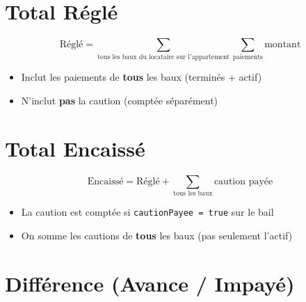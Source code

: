\documentclass[a4paper,12pt]{article}
\begin{document}
\section{Total Réglé}

\begin{formulebox}
\begin{equation}
\text{Réglé} = \sum_{\text{tous les baux du locataire sur l'appartement}} \sum_{\text{paiements}} \text{montant}
\end{equation}
\vspace{-0.3cm}
\begin{itemize}[noitemsep]
  \item Inclut les paiements de \textbf{tous} les baux (terminés + actif)
  \item N'inclut \textbf{pas} la caution (comptée séparément)
\end{itemize}
\end{formulebox}

\section{Total Encaissé}

\begin{formulebox}
\begin{equation}
\text{Encaissé} = \text{Réglé} + \sum_{\text{tous les baux}} \text{caution payée}
\end{equation}
\vspace{-0.3cm}
\begin{itemize}[noitemsep]
  \item La caution est comptée si \texttt{cautionPayee = true} sur le bail
  \item On somme les cautions de \textbf{tous} les baux (pas seulement l'actif)
\end{itemize}
\end{formulebox}

\section{Différence (Avance / Impayé)}
\end{document}
